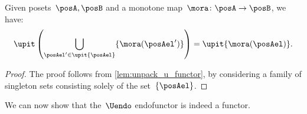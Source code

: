 \begin{lemma}
  \label{lem:unpack_part_2}
  Given posets~$\posA,\posB$ and a monotone map~$\mora\colon \posA\to \posB$, we have:
  \begin{equation}
    \upit \left( \bigcup_{\posAel'\in \upit \{\posAel\}} \{\mora(\posAel')\}\right)=\upit \{\mora(\posAel)\}.
  \end{equation}
\end{lemma}
\begin{proof}
  The proof follows from \cref{lem:unpack_u_functor}, by considering a family of singleton sets consisting solely of the set~$\{\posAel\}$.
\end{proof}
We can now show that the~$\Uendo$ endofunctor is indeed a functor.

